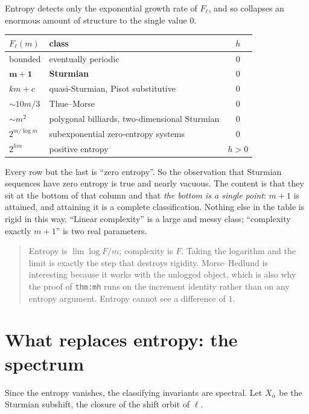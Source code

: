 \documentclass[11pt,a4paper]{article}
\theoremstyle{definition}
\theoremstyle{plain}
\begin{document}
Entropy detects only the exponential growth rate of $F_\ell$, and so collapses
an enormous amount of structure to the single value $0$.

\begin{center}
\begin{tabular}{llc}
\toprule
$F_\ell(m)$ & class & $h$ \\
\midrule
bounded & eventually periodic & $0$ \\
\textcolor{cA}{$\boldsymbol{m+1}$} & \textcolor{cA}{\textbf{Sturmian}} & $0$ \\
$km + c$ & quasi-Sturmian, Pisot substitutive & $0$ \\
$\sim 10m/3$ & Thue--Morse & $0$ \\
$\sim m^2$ & polygonal billiards, two-dimensional Sturmian & $0$ \\
$2^{m/\log m}$ & subexponential zero-entropy systems & $0$ \\
$2^{hm}$ & positive entropy & $h > 0$ \\
\bottomrule
\end{tabular}
\end{center}

Every row but the last is ``zero entropy''. So the observation that Sturmian
sequences have zero entropy is true and nearly vacuous. The content is that they
sit at the bottom of that column and that \emph{the bottom is a single point}:
$m+1$ is attained, and attaining it is a complete classification. Nothing else
in the table is rigid in this way. ``Linear complexity'' is a large and messy
class; ``complexity exactly $m+1$'' is two real parameters.

\begin{quote}
Entropy is $\lim \log F / m$; complexity is $F$. Taking the logarithm and the
limit is exactly the step that destroys rigidity. Morse--Hedlund is interesting
because it works with the unlogged object, which is also why the proof of
\texttt{thm:mh} runs on the increment identity rather than on any entropy
argument. Entropy cannot see a difference of $1$.
\end{quote}

\section{What replaces entropy: the spectrum}

Since the entropy vanishes, the classifying invariants are spectral. Let $X_\alpha$
be the Sturmian subshift, the closure of the shift orbit of $\ell$.
\end{document}
